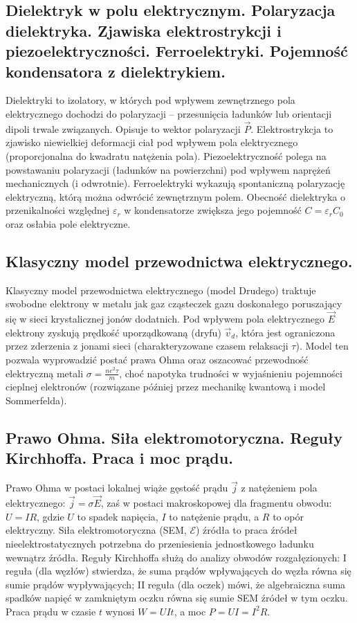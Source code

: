 \documentclass[11pt,a4paper]{article}
\begin{document}
\subsection{Dielektryk w polu elektrycznym. Polaryzacja dielektryka. Zjawiska elektrostrykcji i piezoelektryczności. Ferroelektryki. Pojemność kondensatora z dielektrykiem.}
Dielektryki to izolatory, w których pod wpływem zewnętrznego pola elektrycznego dochodzi do polaryzacji -- przesunięcia ładunków lub orientacji dipoli trwale związanych. Opisuje to wektor polaryzacji $\vec{P}$. Elektrostrykcja to zjawisko niewielkiej deformacji ciał pod wpływem pola elektrycznego (proporcjonalna do kwadratu natężenia pola). Piezoelektryczność polega na powstawaniu polaryzacji (ładunków na powierzchni) pod wpływem naprężeń mechanicznych (i odwrotnie). Ferroelektryki wykazują spontaniczną polaryzację elektryczną, którą można odwrócić zewnętrznym polem. Obecność dielektryka o przenikalności względnej $\varepsilon_r$ w kondensatorze zwiększa jego pojemność $C = \varepsilon_r C_0$ oraz osłabia pole elektryczne.

\subsection{Klasyczny model przewodnictwa elektrycznego.}
Klasyczny model przewodnictwa elektrycznego (model Drudego) traktuje swobodne elektrony w metalu jak gaz cząsteczek gazu doskonałego poruszający się w sieci krystalicznej jonów dodatnich. Pod wpływem pola elektrycznego $\vec{E}$ elektrony zyskują prędkość uporządkowaną (dryfu) $\vec{v}_d$, która jest ograniczona przez zderzenia z jonami sieci (charakteryzowane czasem relaksacji $\tau$). Model ten pozwala wyprowadzić postać prawa Ohma oraz oszacować przewodność elektryczną metali $\sigma = \frac{ne^2\tau}{m}$, choć napotyka trudności w wyjaśnieniu pojemności cieplnej elektronów (rozwiązane później przez mechanikę kwantową i model Sommerfelda).

\subsection{Prawo Ohma. Siła elektromotoryczna. Reguły Kirchhoffa. Praca i moc prądu.}
Prawo Ohma w postaci lokalnej wiąże gęstość prądu $\vec{j}$ z natężeniem pola elektrycznego: $\vec{j} = \sigma \vec{E}$, zaś w postaci makroskopowej dla fragmentu obwodu: $U = IR$, gdzie $U$ to spadek napięcia, $I$ to natężenie prądu, a $R$ to opór elektryczny. Siła elektromotoryczna (SEM, $\mathcal{E}$) źródła to praca źródeł nieelektrostatycznych potrzebna do przeniesienia jednostkowego ładunku wewnątrz źródła. Reguły Kirchhoffa służą do analizy obwodów rozgałęzionych: I reguła (dla węzłów) stwierdza, że suma prądów wpływających do węzła równa się sumie prądów wypływających; II reguła (dla oczek) mówi, że algebraiczna suma spadków napięć w zamkniętym oczku równa się sumie SEM źródeł w tym oczku. Praca prądu w czasie $t$ wynosi $W = UI t$, a moc $P = UI = I^2 R$.
\end{document}
